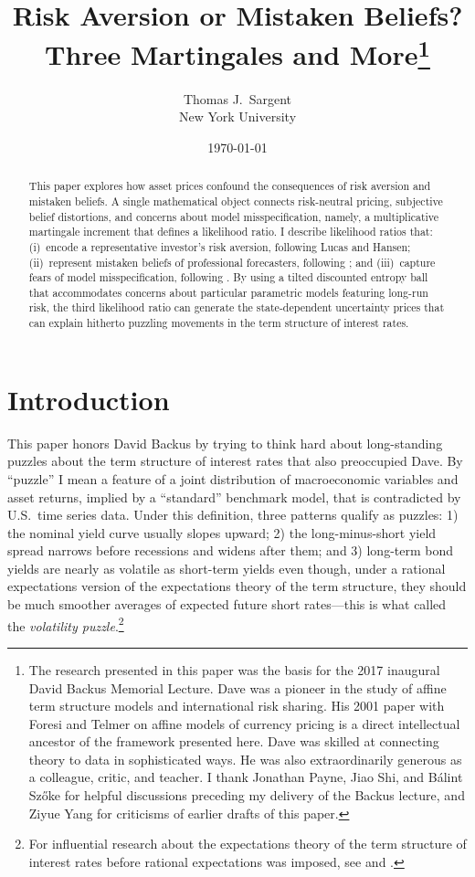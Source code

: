 \documentclass[12pt]{article}
\title{Risk Aversion or Mistaken Beliefs?\\[6pt]
\large Three Martingales and More\thanks{The research presented in this paper was  the basis for
the 2017 inaugural David Backus Memorial Lecture.
Dave was a pioneer in the study of affine term structure models and
international risk sharing.
His 2001 paper \citep{BFT2001} with Foresi and Telmer on affine models of currency
pricing is a direct intellectual ancestor of the framework presented
here.
Dave was skilled at connecting theory to data in sophisticated ways. He was also extraordinarily generous as a colleague,
critic, and teacher.
I thank Jonathan Payne, Jiao Shi, and B\'alint Sz\H{o}ke for helpful discussions preceding my delivery of the Backus lecture,
and Ziyue Yang for criticisms of earlier drafts of this paper.}}
\author{Thomas J.\ Sargent\\[4pt]
\small New York University}
\date{\today}
\theoremstyle{definition}
\begin{document}
\maketitle

\begin{abstract}
This paper explores how asset prices confound the consequences  of risk aversion and mistaken beliefs. 
 A single  mathematical object connects
risk-neutral pricing, subjective belief distortions, and concerns about
model misspecification, namely, a multiplicative martingale increment that defines a likelihood ratio.
 I describe  likelihood ratios that:
(i)~encode a representative investor's risk aversion, following
Lucas and Hansen; (ii)~represent mistaken beliefs of professional
forecasters, following \citet{PSS2015}; and (iii)~capture fears of model misspecification, following
\citet{HSHS2020}.  By using  a tilted discounted entropy
ball that accommodates concerns about particular parametric models
featuring long-run risk, the third likelihood ratio can generate the state-dependent uncertainty
prices that can explain hitherto puzzling movements in the term structure of interest rates.
\end{abstract}

\newpage

\section{Introduction}
\label{sec:intro}



This paper honors  David Backus by trying to think hard about   long-standing puzzles about the term structure of interest rates that also  preoccupied Dave. By ``puzzle'' I mean a feature of a joint distribution of macroeconomic variables and asset returns, implied by a ``standard'' benchmark model, that is contradicted by U.S.\ time series data.  Under this definition, three patterns qualify as puzzles: 1) the nominal yield curve usually slopes upward; 2) the long-minus-short yield spread narrows before recessions and widens after them; and 3) long-term bond yields are nearly as volatile as short-term yields even though, under a rational expectations version of the expectations theory of the term structure, they should be much smoother averages of expected future short rates---this is what \citet{Shiller1979} called the \emph{volatility puzzle}.\footnote{For influential research about the expectations theory of the term structure of interest rates before rational expectations was imposed, see \citet{bierwag1967model} and \citet{meiselman1961term}.}
\end{document}
